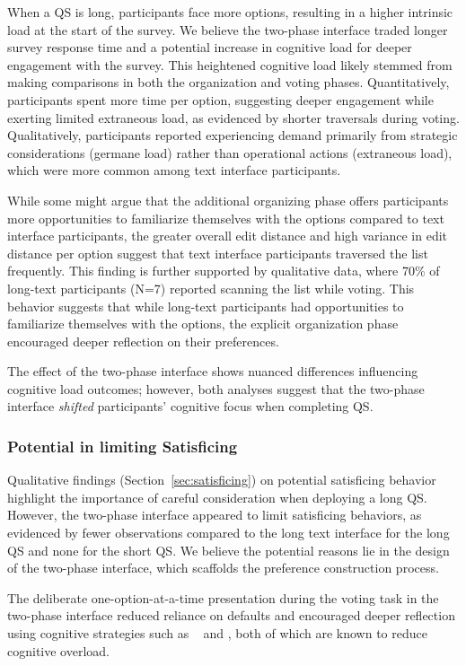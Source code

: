 When a QS is long, participants face more options, resulting in a higher intrinsic load at the start of the survey. We believe the two-phase interface traded longer survey response time and a potential increase in cognitive load for deeper engagement with the survey. This heightened cognitive load likely stemmed from making comparisons in both the organization and voting phases. Quantitatively, participants spent more time per option, suggesting deeper engagement while exerting limited extraneous load, as evidenced by shorter traversals during voting. Qualitatively, participants reported experiencing demand primarily from strategic considerations (germane load) rather than operational actions (extraneous load), which were more common among text interface participants.

While some might argue that the additional organizing phase offers participants more opportunities to familiarize themselves with the options compared to text interface participants, the greater overall edit distance and high variance in edit distance per option suggest that text interface participants traversed the list frequently. This finding is further supported by qualitative data, where 70\% of long-text participants (N=7) reported scanning the list while voting. This behavior suggests that while long-text participants had opportunities to familiarize themselves with the options, the explicit organization phase encouraged deeper reflection on their preferences.

The effect of the two-phase interface shows nuanced differences influencing cognitive load outcomes; however, both analyses suggest that the two-phase interface \textit{shifted} participants' cognitive focus when completing QS.

\subsubsection{Potential in limiting Satisficing}
Qualitative findings (Section~\ref{sec:satisficing}) on potential satisficing behavior highlight the importance of careful consideration when deploying a long QS. However, the two-phase interface appeared to limit satisficing behaviors, as evidenced by fewer observations compared to the long text interface for the long QS and none for the short QS. We believe the potential reasons lie in the design of the two-phase interface, which scaffolds the preference construction process.

The deliberate one-option-at-a-time presentation during the voting task in the two-phase interface reduced reliance on defaults and encouraged deeper reflection using cognitive strategies such as \textit{}~\cite{simonSciencesArtificial1996} and \textit{}, both of which are known to reduce cognitive overload.

